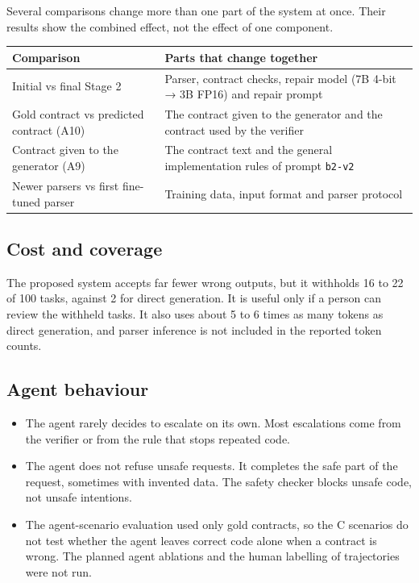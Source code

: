 \documentclass[11pt]{article}
\providecommand{\tightlist}{\setlength{\itemsep}{0pt}\setlength{\parskip}{0pt}}
\begin{document}
Several comparisons change more than one part of the system at once.
Their results show the combined effect, not the effect of one component.

\begin{table}[!tp]
\centering\footnotesize\setlength{\tabcolsep}{3pt}\renewcommand{\arraystretch}{1.1}
\begin{tabularx}{\textwidth}{>{\raggedright\arraybackslash}X>{\raggedright\arraybackslash}X}
\toprule
\textbf{Comparison} & \textbf{Parts that change together} \\
\midrule
Initial vs final Stage 2 & Parser, contract checks, repair model (7B 4-bit → 3B FP16) and repair prompt \\
Gold contract vs predicted contract (A10) & The contract given to the generator and the contract used by the verifier \\
Contract given to the generator (A9) & The contract text and the general implementation rules of prompt \texttt{b2-v2} \\
Newer parsers vs first fine-tuned parser & Training data, input format and parser protocol \\
\bottomrule
\end{tabularx}
\end{table}

\subsection{Cost and coverage}

The proposed system accepts far fewer wrong outputs, but it withholds 16
to 22 of 100 tasks, against 2 for direct generation. It is useful only
if a person can review the withheld tasks. It also uses about 5 to 6
times as many tokens as direct generation, and parser inference is not
included in the reported token counts.

\subsection{Agent behaviour}

\begin{itemize}
\tightlist
\item
  The agent rarely decides to escalate on its own. Most escalations come
  from the verifier or from the rule that stops repeated code.
\item
  The agent does not refuse unsafe requests. It completes the safe part
  of the request, sometimes with invented data. The safety checker
  blocks unsafe code, not unsafe intentions.
\item
  The agent-scenario evaluation used only gold contracts, so the C
  scenarios do not test whether the agent leaves correct code alone when
  a contract is wrong. The planned agent ablations and the human
  labelling of trajectories were not run.
\end{itemize}
\end{document}
